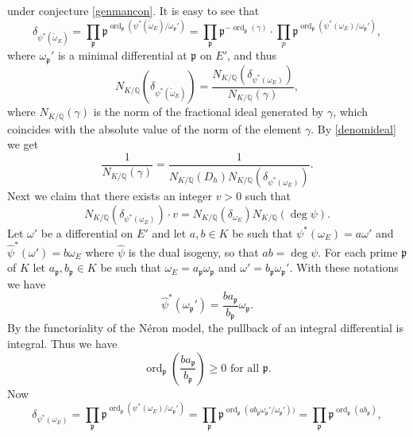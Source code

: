 \documentclass[11pt]{amsart}
\theoremstyle{definition}
\begin{document}
		under conjecture \ref{genmancon}. It is easy to see that
		$$\delta_{\psi^*(\widetilde{\omega}_E)}=\prod_{\mathfrak{p}}{\mathfrak{p}}^{\operatorname{ord}_{\mathfrak{p}}(\psi^*(\widetilde{\omega}_E)/\omega_{\mathfrak{p}}')}=\prod_{\mathfrak{p}}{\mathfrak{p}}^{-\operatorname{ord}_{\mathfrak{p}}(\gamma)}\cdot \prod_p{\mathfrak{p}}^{\operatorname{ord}_{\mathfrak{p}}(\psi^*(\omega_E)/\omega_{\mathfrak{p}}')},$$
		where $\omega_{\mathfrak{p}}'$ is a minimal differential at ${\mathfrak{p}}$ on $E'$, and thus
		$$N_{K/{\mathbb{Q}}}(\delta_{\psi^*(\widetilde{\omega}_E)})=\frac{N_{K/{\mathbb{Q}}}(\delta_{\psi^*(\omega_E)})}{N_{K/{\mathbb{Q}}}(\gamma)},$$
		where $N_{K/{\mathbb{Q}}}(\gamma)$ is the norm of the fractional ideal generated by $\gamma$, which coincides with the absolute value of the norm of the element $\gamma$.
		By \eqref{denomideal} we get
			\begin{equation} \label{normofgamma1}
				\frac{1}{N_{K/{\mathbb{Q}}}(\gamma)}=\frac{1}{N_{K/{\mathbb{Q}}}(D_h)N_{K/{\mathbb{Q}}}(\delta_{\psi^*(\omega_E)})}.
		\end{equation}
		Next we claim that there exists an integer $v>0$ such that
			\begin{equation} \label{normofdelta}
				N_{K/{\mathbb{Q}}}(\delta_{\psi^*(\omega_E)})\cdot v= N_{K/{\mathbb{Q}}}(\delta_{\omega_E})N_{K/{\mathbb{Q}}}(\deg\psi).
		\end{equation}
		Let $\omega'$ be a differential on $E'$ and let $a,b\in K$ be such that $\psi^*(\omega_E)=a\omega'$ and $\widehat{\psi}^*(\omega')=b\omega_E$ where $\widehat{\psi}$ is the dual isogeny, so that $ab=\deg\psi$. For each prime ${\mathfrak{p}}$ of $K$ let $a_{\mathfrak{p}},b_{\mathfrak{p}}\in K$ be such that $\omega_E=a_{\mathfrak{p}}\omega_{\mathfrak{p}}$ and $\omega'=b_{\mathfrak{p}}\omega_{\mathfrak{p}}'$. With these notations we have
		$$\widehat{\psi}^*(\omega_{\mathfrak{p}}')=\frac{ba_{\mathfrak{p}}}{b_{\mathfrak{p}}}\omega_{\mathfrak{p}}.$$
		By the functoriality of the N\'{e}ron model, the pullback of an integral differential is integral. Thus we have
			\begin{equation}\label{due}
				\operatorname{ord}_{\mathfrak{p}}\left(\frac{ba_{\mathfrak{p}}}{b_{\mathfrak{p}}}\right)\geq 0 \mbox{ for all } {\mathfrak{p}}.
		\end{equation}
		Now
		$$\delta_{\psi^*(\omega_E)}=\prod_{\mathfrak{p}}{\mathfrak{p}}^{\operatorname{ord}_{\mathfrak{p}}(\psi^*(\omega_E)/\omega_{\mathfrak{p}}')}=\prod_{\mathfrak{p}}{\mathfrak{p}}^{\operatorname{ord}_{\mathfrak{p}}(ab_{\mathfrak{p}}\omega_{\mathfrak{p}}'/\omega_{\mathfrak{p}}'))}=\prod_{\mathfrak{p}}{\mathfrak{p}}^{\operatorname{ord}_{\mathfrak{p}}(ab_{\mathfrak{p}})},$$
\end{document}
